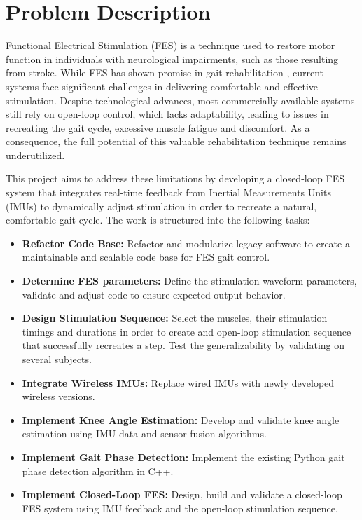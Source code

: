 
\section{Problem Description}
Functional Electrical Stimulation (FES) is a technique used to restore motor function in individuals with neurological impairments, such as those resulting from stroke. While FES has shown promise in gait rehabilitation , current systems face significant challenges in delivering comfortable and effective stimulation. Despite technological advances, most commercially available systems still rely on open-loop control, which lacks adaptability, leading to issues in recreating the gait cycle, excessive muscle fatigue and discomfort. As a consequence, the full potential of this valuable rehabilitation technique remains underutilized.

This project aims to address these limitations by developing a closed-loop FES system that integrates real-time feedback from Inertial Measurements Units (IMUs) to dynamically adjust stimulation in order to recreate a natural, comfortable gait cycle. The work is structured into the following tasks:
\begin{itemize}
    \item \textbf{Refactor Code Base:} Refactor and modularize legacy software to create a maintainable and scalable code base for FES gait control.
    \item \textbf{Determine FES parameters:} Define the stimulation waveform parameters, validate and adjust code to ensure expected output behavior.
    \item \textbf{Design Stimulation Sequence:} Select the muscles, their stimulation timings and durations in order to create and open-loop stimulation sequence that successfully recreates a step. Test the generalizability by validating on several subjects.
    \item \textbf{Integrate Wireless IMUs:} Replace wired IMUs with newly developed wireless versions.
    \item \textbf{Implement Knee Angle Estimation:} Develop and validate knee angle estimation using IMU data and sensor fusion algorithms.
    \item \textbf{Implement Gait Phase Detection:} Implement the existing Python gait phase detection algorithm in C++.
    \item \textbf{Implement Closed-Loop FES:} Design, build and validate a closed-loop FES system using IMU feedback and the open-loop stimulation sequence.
\end{itemize}

